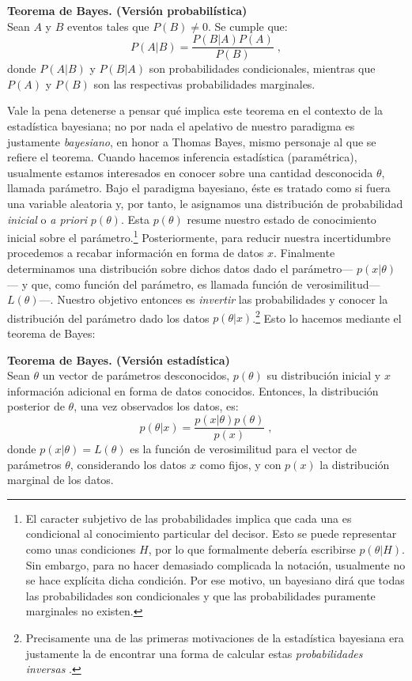 \begin{teo} \label{teo:Bayes_1}
\textbf{Teorema de Bayes. (Versión probabilística)}\\
Sean $A$ y $B$ eventos tales que $P(B) \neq 0$. Se cumple que: 
\begin{equation*}
P(A|B)=\dfrac{P(B|A)P(A)}{P(B)}\;,
\end{equation*}
donde $P(A|B)$ y $P(B|A)$ son probabilidades condicionales, mientras que $P(A)$ y $P(B)$ son las respectivas probabilidades marginales. 
\end{teo}

Vale la pena detenerse a pensar qué implica este teorema en el contexto de la estadística bayesiana; no por nada el apelativo de nuestro paradigma es justamente \textit{bayesiano}, en honor a Thomas Bayes, mismo personaje al que se refiere el teorema. Cuando hacemos inferencia estadística (paramétrica), usualmente estamos interesados en conocer sobre una cantidad desconocida $\theta$, llamada parámetro. Bajo el paradigma bayesiano, éste es tratado como si fuera una variable aleatoria y, por tanto, le asignamos una  distribución de probabilidad \textit{inicial} o \textit{a priori} $p(\theta)$. Esta $p(\theta)$ resume nuestro estado de conocimiento inicial sobre el parámetro.\footnote{El caracter subjetivo de las probabilidades implica que cada una es condicional al conocimiento particular del decisor. Esto se puede representar como unas condiciones $H$, por lo que formalmente debería escribirse $p(\theta|H)$. Sin embargo, para no hacer demasiado complicada la notación, usualmente no se hace explícita dicha condición. Por ese motivo, un bayesiano dirá que todas las probabilidades son condicionales y que las probabilidades puramente marginales no existen.} Posteriormente, para reducir nuestra incertidumbre procedemos a recabar información en forma de datos $x$. Finalmente determinamos una distribución sobre dichos datos dado el parámetro--- $p(x|\theta)$--- y que, como función del parámetro, es llamada función de verosimilitud--- $L(\theta)$---. Nuestro objetivo entonces es \textit{invertir} las probabilidades y conocer la distribución del parámetro dado los datos $p(\theta|x)$.\footnote{Precisamente una de las primeras motivaciones de la estadística bayesiana era justamente la de encontrar una forma de calcular estas \textit{probabilidades inversas} \citep[8]{Robert07}.} Esto lo hacemos mediante el teorema de Bayes: 

\begin{teo} \label{teo:Bayes_2}
\textbf{Teorema de Bayes. (Versión estadística)}\\
Sean $\theta$ un vector de parámetros desconocidos, $p(\theta)$ su distribución inicial y $x$ información adicional en forma de datos conocidos. Entonces, la distribución posterior de $\theta$, una vez observados los datos, es: 
\begin{equation*}
p(\theta|x)=\dfrac{p(x|\theta)p(\theta)}{p(x)}\;,
\end{equation*}
donde $p(x|\theta) = L(\theta)$ es la función de verosimilitud para el vector de parámetros $\theta$, considerando los datos $x$ como fijos, y con $p(x)$ la distribución marginal de los datos.  
\end{teo}

